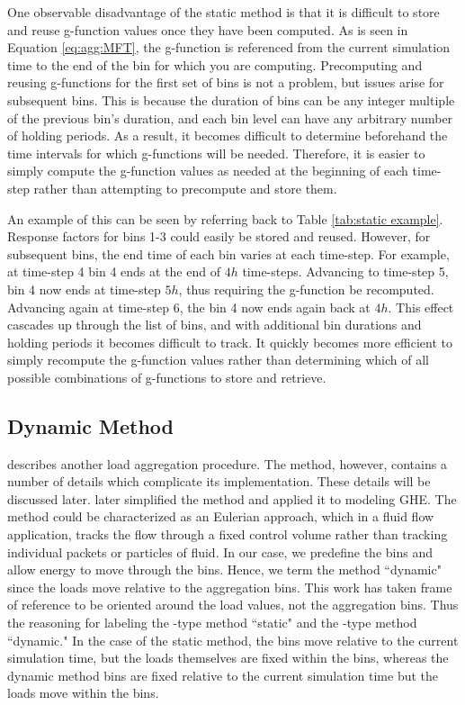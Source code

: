 \documentclass[review,12pt]{elsarticle}
\begin{document}
One observable disadvantage of the static method is that it is difficult to store and reuse g-function values once they have been computed. As is seen in Equation \ref{eq:agg:MFT}, the g-function is referenced from the current simulation time to the end of the bin for which you are computing. Precomputing and reusing g-functions for the first set of bins is not a problem, but issues arise for subsequent bins. This is because the duration of bins can be any integer multiple of the previous bin's duration, and each bin level can have any arbitrary number of holding periods. As a result, it becomes difficult to determine beforehand the time intervals for which g-functions will be needed. Therefore, it is easier to simply compute the g-function values as needed at the beginning of each time-step rather than attempting to precompute and store them.

An example of this can be seen by referring back to Table \ref{tab:static example}. Response factors for bins 1-3 could easily be stored and reused. However, for subsequent bins, the end time of each bin varies at each time-step. For example, at time-step 4 bin 4 ends at the end of $4h$ time-steps. Advancing to time-step 5, bin 4 now ends at time-step $5h$, thus requiring the g-function be recomputed. Advancing again at time-step 6, the bin 4 now ends again back at $4h$. This effect cascades up through the list of bins, and with additional bin durations and holding periods it becomes difficult to track. It quickly becomes more efficient to simply recompute the g-function values rather than determining which of all possible combinations of g-functions to store and retrieve.

\subsection{Dynamic Method}

\cite{Wentzel2005} describes another load aggregation procedure. The method, however, contains a number of details which complicate its implementation. These details will be discussed later.\cite{ClaessonJaved2012} later simplified the method and applied it to modeling GHE. The method could be characterized as an Eulerian approach, which in a fluid flow application, tracks the flow through a fixed control volume rather than tracking individual packets or particles of fluid. In our case, we predefine the bins and allow energy to move through the bins. Hence, we term the method ``dynamic" since the loads move relative to the aggregation bins. This work has taken frame of reference to be oriented around the load values, not the aggregation bins. Thus the reasoning for labeling the \cite{YavuzturkSpitler1999}-type method ``static" and the \cite{ClaessonJaved2012}-type method ``dynamic." In the case of the static method, the bins move relative to the current simulation time, but the loads themselves are fixed within the bins, whereas the dynamic method bins are fixed relative to the current simulation time but the loads move within the bins.
\end{document}
